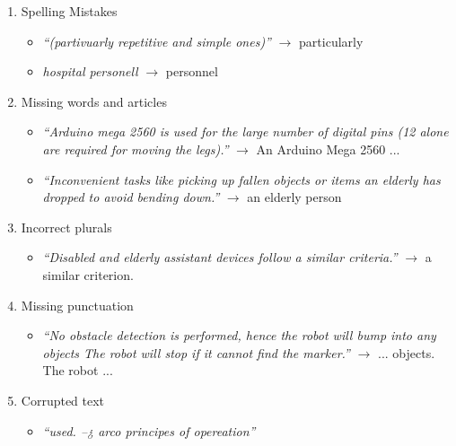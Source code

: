 \documentclass{article}
\theoremstyle{definition}
\begin{document}
\begin{enumerate}
  \item Spelling Mistakes
  \begin{itemize}
    \item \emph{``(partivuarly repetitive and simple ones)''}  $\to$ particularly
    \item \emph{hospital personell} $\to$ personnel
  \end{itemize}

  \item Missing words and articles
  \begin{itemize}
    \item \emph{``Arduino mega 2560 is used for the large number of digital pins (12 alone are required for
moving the legs).''} $\to$ An Arduino Mega 2560 ...
    \item \emph{``Inconvenient tasks like picking up fallen objects or items an elderly has
dropped to avoid bending down.''} $\to$ an elderly person
  \end{itemize}


  \item Incorrect plurals
  \begin{itemize}
    \item \emph{``Disabled and elderly assistant devices follow a similar criteria.''} $\to$ a similar criterion.
  \end{itemize}

  \item Missing punctuation
  \begin{itemize}
    \item \emph{``No obstacle detection is performed, hence the robot will bump into any objects The robot will stop if it cannot find the marker.''} $\to$ ... objects. The robot ...
  \end{itemize}

  \item Corrupted text
  \begin{itemize}
    \item 
    \emph{ ``used. \newline
    –¿ arco principes of opereation''
    }
  \end{itemize}


\end{enumerate}
\end{document}
